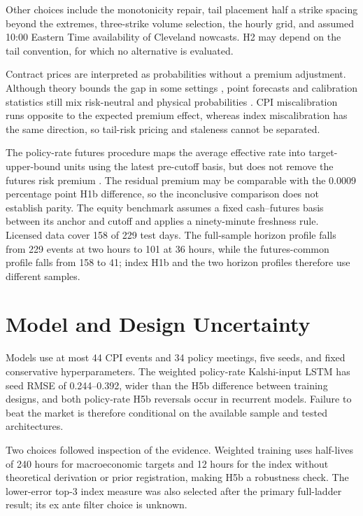 \documentclass[12pt,a4paper]{report}
\begin{document}
Other choices include the monotonicity repair, tail placement half a strike
spacing beyond the extremes, three-strike volume selection, the hourly grid,
and assumed 10:00 Eastern Time availability of Cleveland nowcasts. H2 may
depend on the tail convention, for which no alternative is evaluated.

Contract prices are interpreted as probabilities without a premium
adjustment. Although theory bounds the gap in some settings
\parencite{wolfers2006, manski2006}, point forecasts and calibration statistics
still mix risk-neutral and physical probabilities \parencite{kitsul2013}.
CPI miscalibration runs opposite to the expected premium effect, whereas index
miscalibration has the same direction, so tail-risk pricing and staleness
cannot be separated.

The policy-rate futures procedure maps the average effective rate into
target-upper-bound units using the latest pre-cutoff basis, but does not remove
the futures risk premium \parencite{piazzesi2008}. The residual premium may be
comparable with the 0.0009 percentage point H1b difference, so the inconclusive
comparison does not establish parity. The equity benchmark assumes a fixed
cash--futures basis between its anchor and cutoff and applies a ninety-minute
freshness rule. Licensed data cover 158 of 229 test days. The full-sample
horizon profile falls from 229 events at two hours to 101 at 36 hours, while
the futures-common profile falls from 158 to 41; index H1b and the two horizon
profiles therefore use different samples.

\section{Model and Design Uncertainty}
\label{sec:limitations-models}

Models use at most 44 CPI events and 34 policy meetings, five seeds, and fixed
conservative hyperparameters. The weighted policy-rate Kalshi-input LSTM has
seed RMSE of 0.244--0.392, wider than the H5b difference between training
designs, and both policy-rate H5b reversals occur in recurrent models. Failure
to beat the market is therefore conditional on the available sample and tested
architectures.

Two choices followed inspection of the evidence. Weighted training uses
half-lives of 240 hours for macroeconomic targets and 12 hours for the index
without theoretical derivation or prior registration, making H5b a robustness
check. The lower-error top-3 index measure was also selected after the primary
full-ladder result; its ex ante filter choice is unknown.
\end{document}
